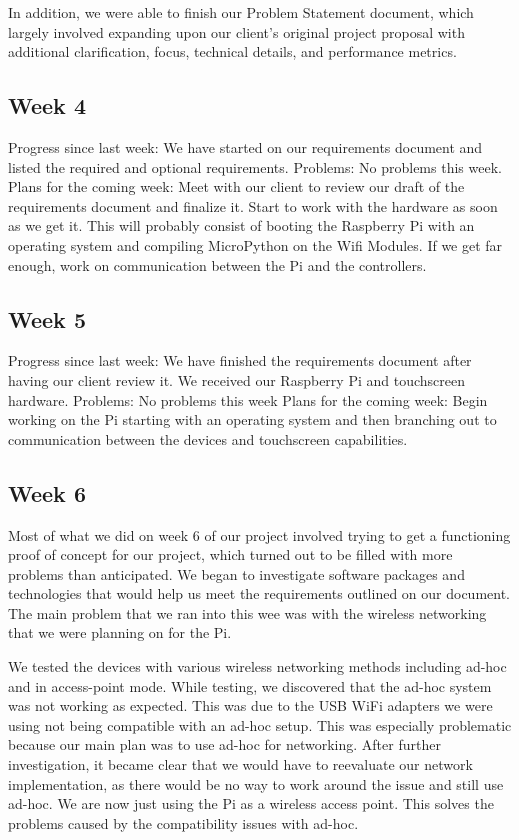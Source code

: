 \documentclass[letterpaper,10pt]{article}
\begin{document}
In addition, we were able to finish our Problem Statement document, which
largely involved expanding upon our client's original project proposal with
additional clarification, focus, technical details, and performance metrics.

\subsection{Week 4}
 
Progress since last week: 
We have started on our requirements document and listed the required and optional requirements. 
Problems: 
No problems this week. 
Plans for the coming week: 
Meet with our client to review our draft of the requirements document and finalize it. 
Start to work with the hardware as soon as we get it. This will probably consist of booting the Raspberry Pi with an operating system and compiling MicroPython on the Wifi Modules. 
If we get far enough, work on communication between the Pi and the controllers. 

\subsection{Week 5}
 
Progress since last week: 
We have finished the requirements document after having our client review it. 
We received our Raspberry Pi and touchscreen hardware. 
Problems: 
No problems this week 
Plans for the coming week: 
Begin working on the Pi starting with an operating system and then branching out to communication between the devices and touchscreen capabilities. 

\subsection{Week 6}
 
Most of what we did on week 6 of our project involved trying to get a functioning proof of concept for our project, which turned out to be filled with more problems than anticipated. We began to investigate software packages and technologies that would help us meet the requirements outlined on our document. The main problem that we ran into this wee was with the wireless networking that we were planning on for the Pi.

We tested the devices with various wireless networking methods including ad-hoc and in access-point mode. While testing, we discovered that the ad-hoc system was not working as expected. This was due to the USB WiFi adapters we were using not being compatible with an ad-hoc setup. This was especially problematic because our main plan was to use ad-hoc for networking. After further investigation, it became clear that we would have to reevaluate our network implementation, as there would be no way to work around the issue and still use ad-hoc. We are now just using the Pi as a wireless access point. This solves the problems caused by the compatibility issues with ad-hoc.
\end{document}

